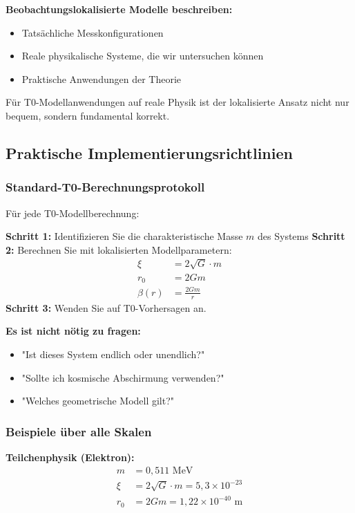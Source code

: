 \documentclass[12pt,a4paper]{article}
\begin{document}
\textbf{Beobachtungslokalisierte Modelle beschreiben:}
\begin{itemize}
	\item Tatsächliche Messkonfigurationen
	\item Reale physikalische Systeme, die wir untersuchen können
	\item Praktische Anwendungen der Theorie
\end{itemize}

Für T0-Modellanwendungen auf reale Physik ist der lokalisierte Ansatz nicht nur bequem, sondern fundamental korrekt.

\subsection{Praktische Implementierungsrichtlinien}
\label{subsec:practical_implementation}

\subsubsection{Standard-T0-Berechnungsprotokoll}
\label{subsubsec:standard_calculation_protocol}

Für jede T0-Modellberechnung:

\textbf{Schritt 1:} Identifizieren Sie die charakteristische Masse $m$ des Systems
\textbf{Schritt 2:} Berechnen Sie mit lokalisierten Modellparametern:
\begin{align}
	\xi &= 2\sqrt{G} \cdot m \\
	r_0 &= 2Gm \\
	\beta(r) &= \frac{2Gm}{r}
\end{align}
\textbf{Schritt 3:} Wenden Sie auf T0-Vorhersagen an.

\textbf{Es ist nicht nötig zu fragen:}
\begin{itemize}
	\item "Ist dieses System endlich oder unendlich?"
	\item "Sollte ich kosmische Abschirmung verwenden?"
	\item "Welches geometrische Modell gilt?"
\end{itemize}

\subsubsection{Beispiele über alle Skalen}
\label{subsubsec:examples_all_scales}

\textbf{Teilchenphysik (Elektron):}
\begin{align}
	m &= 0,511 \text{ MeV} \\
	\xi &= 2\sqrt{G} \cdot m = 5,3 \times 10^{-23} \\
	r_0 &= 2Gm = 1,22 \times 10^{-40} \text{ m}
\end{align}
\end{document}
